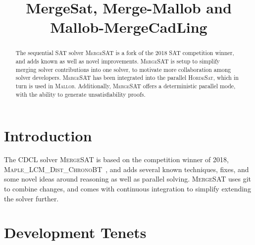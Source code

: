 \documentclass[conference]{IEEEtran}
\begin{document}
	
\title{MergeSat, Merge-Mallob and Mallob-MergeCadLing} %

\author{
}

\maketitle

\def\coprocessor{\textsc{Coprocessor}\xspace}
\def\glucose{\textsc{Glucose~2.2}\xspace}
\def\minisat{\textsc{Minisat~2.2}\xspace}
\def\riss{\textsc{Riss}\xspace}
\def\mergesat{\textsc{MergeSAT}\xspace}
\def\hordesat{\textsc{HordeSat}\xspace}
\def\mergehordesat{\textsc{Merge-HordeSat}\xspace}
\def\mergemallob{\textsc{Merge-Mallob}\xspace}
\def\mallob{\textsc{Mallob}\xspace}
\def\cadical{\textsc{CaDiCaL}\xspace}
\def\lingeling{\textsc{lingeling}\xspace}
\def\yalsat{\textsc{Yalsat}\xspace}
\def\kissat{\textsc{Kissat}\xspace}

\begin{abstract}
The sequential SAT solver \mergesat is a fork of the 2018 SAT competition winner, and adds known as well as novel improvements.
\mergesat is setup to simplify merging solver contributions into one solver, to motivate more collaboration among solver developers.
\mergesat has been integrated into the parallel \hordesat, which in turn is used in \mallob.
Additionally, \mergesat offers a deterministic parallel mode, with the ability to generate unsatisfiability proofs.
\end{abstract}


\section{Introduction}

The CDCL solver \mergesat is based on the competition winner of 2018, \textsc{Maple\_LCM\_Dist\_ChronoBT}~\cite{MapleLCMDistChronoBT}, and adds several known techniques, fixes, and some novel ideas around reasoning as well as parallel solving.
\mergesat uses git to combine changes, and comes with continuous integration to simplify extending the solver further.

\section{Development Tenets}
\end{document}
